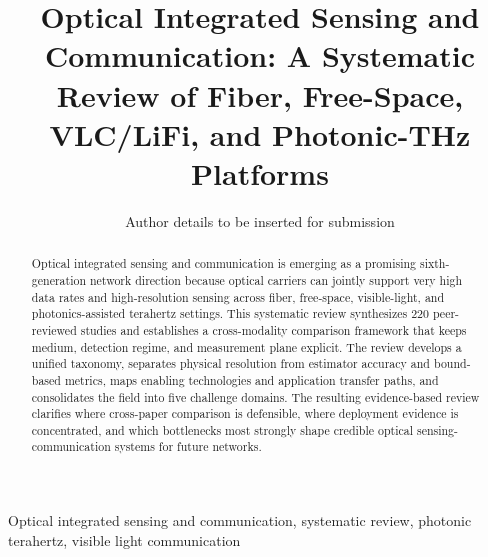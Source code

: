 \documentclass[10pt,journal]{IEEEtran}
\begin{document}
\title{Optical Integrated Sensing and Communication: A Systematic Review of Fiber, Free-Space, VLC/LiFi, and Photonic-THz Platforms}

\author{Author details to be inserted for submission}


\maketitle

\begin{abstract}
Optical integrated sensing and communication is emerging as a promising sixth-generation network direction because optical carriers can jointly support very high data rates and high-resolution sensing across fiber, free-space, visible-light, and photonics-assisted terahertz settings. This systematic review synthesizes 220 peer-reviewed studies and establishes a cross-modality comparison framework that keeps medium, detection regime, and measurement plane explicit. The review develops a unified taxonomy, separates physical resolution from estimator accuracy and bound-based metrics, maps enabling technologies and application transfer paths, and consolidates the field into five challenge domains. The resulting evidence-based review clarifies where cross-paper comparison is defensible, where deployment evidence is concentrated, and which bottlenecks most strongly shape credible optical sensing-communication systems for future networks.
\end{abstract}

\begin{IEEEkeywords}
Optical integrated sensing and communication, systematic review, photonic terahertz, visible light communication
\end{IEEEkeywords}

\end{document}
